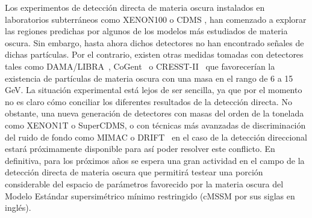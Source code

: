 Los experimentos de detección directa de materia oscura instalados en
laboratorios subterráneos como XENON100 \cite{Aprile:2011ts}
o CDMS \cite{Ahmed:2009zw,Ahmed:2010wy}, han
comenzado a explorar las regiones predichas por algunos de los modelos
más estudiados de materia oscura.
Sin embargo, hasta ahora dichos detectores no han encontrado señales
de dichas partículas. Por el contrario, existen otras medidas tomadas
con detectores tales como DAMA/LIBRA~\cite{Bernabei:2010mq},
CoGent~\cite{Aalseth:2011wp} o CRESST-II~\cite{Angloher:2011uu} que
favorecerían la existencia de partículas de materia oscura con una masa
en el rango de 6 a 15 GeV.
La situación experimental está lejos de ser sencilla, ya que por el momento
no es claro cómo conciliar los diferentes resultados de la detección directa.
No obstante, una nueva generación de detectores con masas del orden de la
tonelada como XENON1T o SuperCDMS, o con técnicas más avanzadas de
discriminación del ruido de fondo como MIMAC \cite{Billard:2011yf}
o DRIFT~\cite{Pipe:2010zz} en el caso de la detección direccional estará
próximamente disponible para así poder resolver este conflicto.
En definitiva, para los próximos años se espera una gran actividad en
el campo de la detección directa de materia oscura que permitirá
testear una porción considerable del espacio de parámetros favorecido por
la materia oscura del Modelo Estándar supersimétrico mínimo restringido
(cMSSM por sus siglas en inglés).

